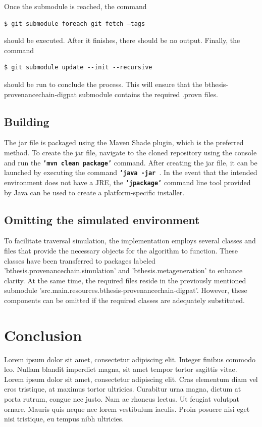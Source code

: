\documentclass[
  digital,     %
  oneside,     %
  nosansbold,  %
  nocolorbold, %
  lof,         %
  lot,         %
]{fithesis4}
\begin{document}
Once the submodule is reached, the command 

\begin{verbatim}
$ git submodule foreach git fetch –tags
\end{verbatim}

should be executed. After it finishes, there should be no output. Finally, the command

\begin{verbatim}
$ git submodule update --init --recursive  
\end{verbatim}

should be run to conclude the process. This will ensure that the bthesis-provenancechain-digpat submodule contains the required .provn files.

\section{Building}
The jar file is packaged using the Maven Shade plugin, which is the preferred method. To create the jar file, navigate to the cloned repository using the console and run the \textbf{\texttt{'mvn clean package'}} command. After creating the jar file, it can be launched by executing the command \textbf{\texttt{'java -jar }}. In the event that the intended environment does not have a JRE, the \textbf{\texttt{'jpackage'}} command line tool provided by Java can be used to create a platform-specific installer.

\section{Omitting the simulated environment}
To facilitate traversal simulation, the implementation employs several classes and files that provide the necessary objects for the algorithm to function. These classes have been transferred to packages labeled 'bthesis.provenancechain.simulation' and 'bthesis.metageneration' to enhance clarity. At the same time, the required files reside in the previously mentioned submodule 'src.main.resources.bthesis-provenancechain-digpat'. However, these components can be omitted if the required classes are adequately substituted.
\shorthandon{-}


\chapter*{Conclusion}
\shorthandoff{-}
Lorem ipsum dolor sit amet, consectetur adipiscing elit. Integer finibus commodo leo. Nullam blandit imperdiet magna, sit amet tempor tortor sagittis vitae. Lorem ipsum dolor sit amet, consectetur adipiscing elit. Cras elementum diam vel eros tristique, at maximus tortor ultricies. Curabitur urna magna, dictum at porta rutrum, congue nec justo. Nam ac rhoncus lectus. Ut feugiat volutpat ornare. Mauris quis neque nec lorem vestibulum iaculis. Proin posuere nisi eget nisi tristique, eu tempus nibh ultricies.
\shorthandon{-}
\end{document}
